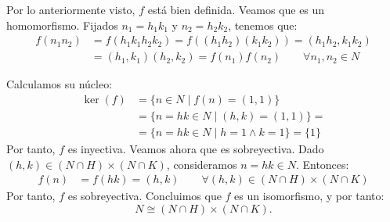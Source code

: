 \begin{ejercicio}
    Por lo anteriormente visto, $f$ está bien definida. Veamos que es un homomorfismo. Fijados $n_1= h_1k_1$ y $n_2=h_2k_2$, tenemos que:
    \begin{align*}
        f(n_1n_2) &= f(h_1k_1h_2k_2) = f((h_1h_2)(k_1k_2)) = (h_1h_2,k_1k_2)\\
        &= (h_1,k_1)(h_2,k_2) = f(n_1)f(n_2)\qquad \forall n_1,n_2\in N
    \end{align*}

    Calculamos su núcleo:
    \begin{align*}
        \ker(f) &= \{n\in N\mid f(n)=(1,1)\}\\
        &= \{n=hk\in N\mid (h,k)=(1,1)\} =\\&= \{n=hk\in N\mid h=1\land k=1\} = \{1\}
    \end{align*}
    Por tanto, $f$ es inyectiva. Veamos ahora que es sobreyectiva. Dado $(h,k)\in (N\cap H)\times (N\cap K)$, consideramos $n=hk\in N$. Entonces:
    \begin{align*}
        f(n) &= f(hk) = (h,k) \qquad \forall (h,k)\in (N\cap H)\times (N\cap K)
    \end{align*}
    Por tanto, $f$ es sobreyectiva. Concluimos que $f$ es un isomorfismo, y por tanto:
    \begin{equation*}
        N\cong (N\cap H)\times (N\cap K).
    \end{equation*}
\end{ejercicio}

